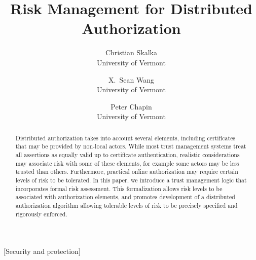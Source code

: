 \title{Risk Management for Distributed Authorization}


\author{
Christian Skalka   \\ University of Vermont
\and 
X.~Sean Wang  \\ University of Vermont
\and 
Peter Chapin \\ University of Vermont
}

\begin{abstract} 
Distributed authorization takes into account several elements,
including certificates that may be provided by non-local actors.
While most trust management systems treat all assertions as equally
valid up to certificate authentication, realistic considerations may
associate risk with some of these elements, for example some actors
may be less trusted than others.  Furthermore, practical online
authorization may require certain levels of risk to be tolerated. In
this paper, we introduce a trust management logic that incorporates
formal risk assessment.  This formalization allows risk levels to be
associated with authorization elements, and promotes development of a
distributed authorization algorithm allowing tolerable levels of risk
to be precisely specified and rigorously enforced.
\end{abstract}

[Security and protection]



\maketitle
